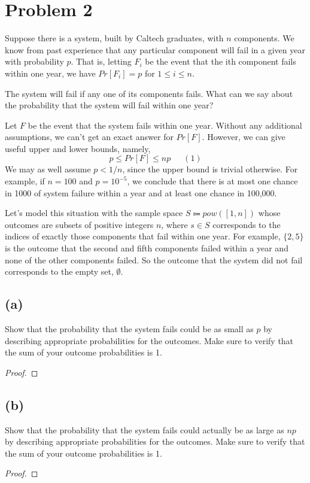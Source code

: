 \documentclass[14pt]{extarticle}
\begin{document}
\section{Problem 2}
Suppose there is a system, built by Caltech graduates, with $n$ components. We know from past experience that any particular component will fail in a given year with probability $p$. That is, letting $F_i$ be the event that the ith component fails within one year, we have $Pr[F_i] = p$ for $1 \leq i \leq n$.

The system will fail if any one of its components fails. What can we say about the probability that the system will fail within one year?

Let $F$ be the event that the system fails within one year. Without any additional assumptions, we can’t get an exact answer for $Pr[F]$. However, we can give useful upper and lower bounds, namely,
$$
p \leq Pr[F] \leq np \,\,\,\,\,\,\,\,\,(1)
$$
We may as well assume $p < 1/n$, since the upper bound is trivial otherwise. For example, if $n = 100$ and $p = 10^{-5}$, we conclude that there is at most one chance in 1000 of system failure within a year and at least one chance in 100,000.

Let’s model this situation with the sample space $S \Coloneqq pow([1,n])$ whose outcomes are subsets of positive integers $n$, where $s \in S$ corresponds to the indices of exactly those components that fail within one year. For example, $\{2, 5\}$ is the outcome that the second and fifth components failed within a year and none of the other components failed. So the outcome that the system did not fail corresponds to the empty set, $\emptyset$.

\subsection{(a)}
Show that the probability that the system fails could be as small as $p$ by describing appropriate probabilities for the outcomes. Make sure to verify that the sum of your outcome probabilities is 1.
\begin{proof}
\end{proof}

\subsection{(b)}
Show that the probability that the system fails could actually be as large as $np$ by describing appropriate probabilities for the outcomes. Make sure to verify that the sum of your outcome probabilities is 1.
\begin{proof}
\end{proof}
\end{document}
